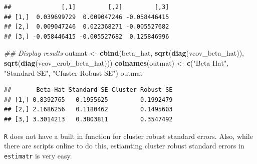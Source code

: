 \documentclass[]{article}
\newenvironment{Shaded}{\begin{snugshade}}{\end{snugshade}}
\newcommand{\CommentTok}[1]{\textcolor[rgb]{0.56,0.35,0.01}{\textit{#1}}}
\newcommand{\DataTypeTok}[1]{\textcolor[rgb]{0.13,0.29,0.53}{#1}}
\newcommand{\KeywordTok}[1]{\textcolor[rgb]{0.13,0.29,0.53}{\textbf{#1}}}
\newcommand{\NormalTok}[1]{#1}
\newcommand{\OperatorTok}[1]{\textcolor[rgb]{0.81,0.36,0.00}{\textbf{#1}}}
\newcommand{\StringTok}[1]{\textcolor[rgb]{0.31,0.60,0.02}{#1}}
\begin{document}
\begin{verbatim}
##              [,1]         [,2]         [,3]
## [1,]  0.039699729  0.009047246 -0.058446415
## [2,]  0.009047246  0.022368271 -0.005527682
## [3,] -0.058446415 -0.005527682  0.125846996
\end{verbatim}

\begin{Shaded}
\begin{Highlighting}[]
\CommentTok{## Display results}
\NormalTok{outmat <-}\StringTok{ }\KeywordTok{cbind}\NormalTok{(beta_hat, }\KeywordTok{sqrt}\NormalTok{(}\KeywordTok{diag}\NormalTok{(vcov_beta_hat)),  }\KeywordTok{sqrt}\NormalTok{(}\KeywordTok{diag}\NormalTok{(vcov_crob_beta_hat)))}
\KeywordTok{colnames}\NormalTok{(outmat) <-}\StringTok{ }\KeywordTok{c}\NormalTok{(}\StringTok{"Beta Hat"}\NormalTok{, }\StringTok{"Standard SE"}\NormalTok{, }\StringTok{"Cluster Robust SE"}\NormalTok{)}
\NormalTok{outmat}
\end{Highlighting}
\end{Shaded}

\begin{verbatim}
##       Beta Hat Standard SE Cluster Robust SE
## [1,] 0.8392765   0.1955625         0.1992479
## [2,] 2.1686256   0.1180462         0.1495603
## [3,] 3.3014213   0.3803811         0.3547492
\end{verbatim}

\texttt{R} does not have a built in function for cluster robust standard
errors. Also, while there are scripts online to do this, estiamting
cluster robust standard errors in \texttt{estimatr} is very easy.

\begin{Shaded}
\end{Shaded}
\end{document}

